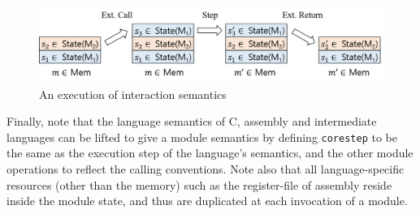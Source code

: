 \begin{figure}[t]
\includegraphics[width=0.9\linewidth]{images/intersem.png}
\caption{An execution of interaction semantics}
\label{fig:inter-sem}
\end{figure}


Finally, note that the language semantics of C, assembly and
intermediate languages can be lifted to give a module semantics by
defining \texttt{corestep} to be the same as the execution step of the
language's semantics, and the other module operations to reflect the
calling conventions. Note also that all language-specific resources
(\ie other than the memory)
such as the register-file of assembly 
reside inside the module state, and thus are
duplicated at each invocation of a module.

